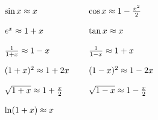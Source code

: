 \begin{equation*}
	\begin{array}{ l l }
		\sin x\approx x & \cos x\approx 1-\frac{x^2}{2}\\
		[4mm]
		e^x \approx 1+x & \tan x\approx x\\
		[4mm]
		\frac{1}{1+x} \approx 1-x & \frac{1}{1-x} \approx 1+x\\
		[4mm]
		( 1+x)^2 \approx 1+2x\ \ \ \  & ( 1-x)^2 \approx 1-2x\\
		[4mm]
		\sqrt{1+x} \approx 1+\frac{x}{2} & \sqrt{1-x} \approx 1-\frac{x}{2}\\
		[4mm]
		\ln( 1+x) \approx x &
	\end{array}
\end{equation*}